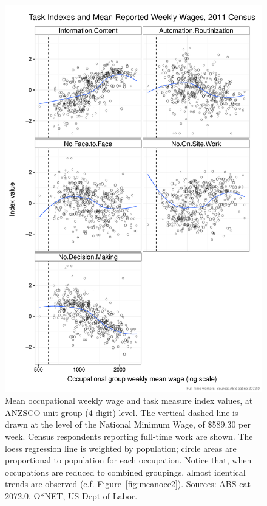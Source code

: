 \begin{figure}
  \centering
  \includegraphics[width=\textwidth]{../figure/wages_indexes_4digit.pdf}
  \caption{Mean occupational weekly wage and task measure index values, at ANZSCO unit group (4-digit) level. The vertical dashed line is drawn at the level of the National Minimum Wage, of \$589.30 per week. Census respondents reporting full-time work are shown. The loess regression line is weighted by population; circle areas are proportional to population for each occupation. Notice that, when occupations are reduced to combined groupings, almost identical trends are observed (c.f. Figure~\ref{fig:meanocc2}). Sources: ABS cat 2072.0, O*NET, US Dept of Labor.}
  \label{fig:meanocc4dig}
\end{figure}

